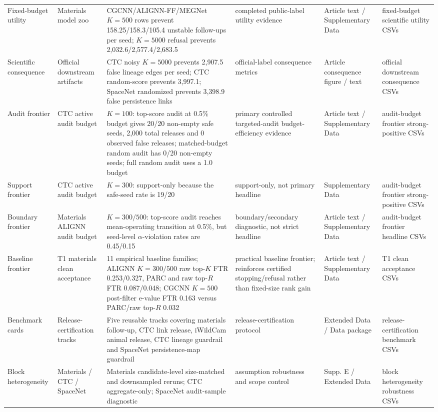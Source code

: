 \documentclass[11pt]{article}
\begin{document}
\begin{table}[h]
{\begin{tabular}{llllll}
Fixed-budget utility & Materials model zoo & CGCNN/ALIGNN-FF/MEGNet \(K=500\) rows prevent 158.25/158.3/105.4 unstable follow-ups per seed; \(K=5000\) refusal prevents 2,032.6/2,577.4/2,683.5 & completed public-label utility evidence & Article text / Supplementary Data & fixed-budget scientific utility CSVs \\
Scientific consequence & Official downstream artifacts & CTC noisy \(K=5000\) prevents 2,907.5 false lineage edges per seed; CTC random-score prevents 3,997.1; SpaceNet randomized prevents 3,398.9 false persistence links & official-label consequence metrics & Article consequence figure / text & official downstream consequence CSVs \\
Audit frontier & CTC active audit budget & \(K=100\): top-score audit at 0.5\% budget gives 20/20 non-empty safe seeds, 2,000 total releases and 0 observed false releases; matched-budget random audit has 0/20 non-empty seeds; full random audit uses a 1.0 budget & primary controlled targeted-audit budget-efficiency evidence & Article text / Supplementary Data & audit-budget frontier strong-positive CSVs \\
Support frontier & CTC active audit budget & \(K=300\): support-only because the safe-seed rate is 19/20 & support-only, not primary headline & Supplementary Data & audit-budget frontier strong-positive CSVs \\
Boundary frontier & Materials ALIGNN audit budget & \(K=300/500\): top-score audit reaches mean-operating transition at 0.5\%, but seed-level \(\alpha\)-violation rates are 0.45/0.15 & boundary/secondary diagnostic, not strict headline & Article text / Supplementary Data & audit-budget frontier headline CSVs \\
Baseline frontier & T1 materials clean acceptance & 11 empirical baseline families; ALIGNN \(K=300/500\) raw top-\(K\) FTR 0.253/0.327, PARC and raw top-\(R\) FTR 0.087/0.048; CGCNN \(K=500\) post-filter e-value FTR 0.163 versus PARC/raw top-\(R\) 0.032 & practical baseline frontier; reinforces certified stopping/refusal rather than fixed-size rank gain & Article text / Supplementary Data & T1 clean acceptance CSVs \\
Benchmark cards & Release-certification tracks & Five reusable tracks covering materials follow-up, CTC link release, iWildCam animal release, CTC lineage guardrail and SpaceNet persistence-map guardrail & release-certification protocol & Extended Data / Data package & release-certification benchmark CSVs \\
Block heterogeneity & Materials / CTC / SpaceNet & Materials candidate-level size-matched and downsampled reruns; CTC aggregate-only; SpaceNet audit-sample diagnostic & assumption robustness and scope control & Supp. E / Extended Data & block heterogeneity robustness CSVs \\

\end{tabular}}
\end{table}
\end{document}
